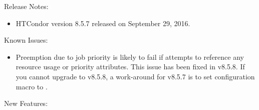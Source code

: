 \noindent Release Notes:

\begin{itemize}

\item HTCondor version 8.5.7 released on September 29, 2016.

\end{itemize}

\noindent Known Issues:

\begin{itemize}

\item Preemption due to job priority is likely to fail if 
attempts to reference any resource usage or priority attributes. This issue has
been fixed in v8.5.8.  If you cannot upgrade to v8.5.8, a work-around for v8.5.7
is to set configuration macro  to .

\end{itemize}

\noindent New Features:

